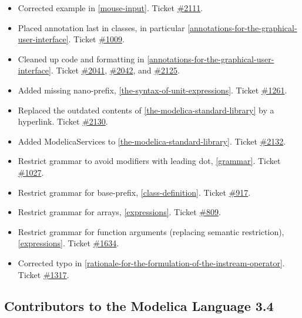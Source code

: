 \documentclass[10pt,a4paper]{report}
\def\doublelabel#1{\label{#1}\hypertarget{#1}{}}
\begin{document}
\begin{itemize}
\item
  Corrected example in \ref{mouse-input}. Ticket
  \href{https://trac.modelica.org/Modelica/ticket/2111}{\#2111}.
\item
  Placed annotation last in classes, in particular \ref{annotations-for-the-graphical-user-interface}. Ticket
  \href{https://trac.modelica.org/Modelica/ticket/1009}{\#1009}.
\item
  Cleaned up code and formatting in \ref{annotations-for-the-graphical-user-interface}. Ticket
  \href{https://trac.modelica.org/Modelica/ticket/2041}{\#2041},
  \href{https://trac.modelica.org/Modelica/ticket/2042}{\#2042}, and
  \href{https://trac.modelica.org/Modelica/ticket/2125}{\#2125}.
\item
  Added missing nano-prefix, \ref{the-syntax-of-unit-expressions}. Ticket
  \href{https://trac.modelica.org/Modelica/ticket/1261}{\#1261}.
\item
  Replaced the outdated contents of \ref{the-modelica-standard-library} by a hyperlink. Ticket
  \href{https://trac.modelica.org/Modelica/ticket/2130}{\#2130}.
\item
  Added ModelicaServices to \ref{the-modelica-standard-library}. Ticket
  \href{https://trac.modelica.org/Modelica/ticket/2132}{\#2132}.
\item
  Restrict grammar to avoid modifiers with leading dot, \ref{grammar}.
  Ticket \href{https://trac.modelica.org/Modelica/ticket/1027}{\#1027}.
\item
  Restrict grammar for base-prefix, \ref{class-definition}. Ticket
  \href{https://trac.modelica.org/Modelica/ticket/917}{\#917}.
\item
  Restrict grammar for arrays, \ref{expressions}. Ticket
  \href{https://trac.modelica.org/Modelica/ticket/809}{\#809}.
\item
  Restrict grammar for function arguments (replacing semantic
  restriction), \ref{expressions}. Ticket
  \href{https://trac.modelica.org/Modelica/ticket/1634}{\#1634}.
\item
  Corrected typo in \ref{rationale-for-the-formulation-of-the-instream-operator}. Ticket
  \href{https://trac.modelica.org/Modelica/ticket/1317}{\#1317}.
\end{itemize}

\subsection{Contributors to the Modelica Language 3.4}\doublelabel{contributors-to-the-modelica-language-3-4}
\end{document}
